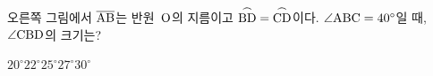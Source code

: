\noindent\begin{minipage}[t]{0.58\linewidth}\vspace{0pt}\raggedright 오른쪽 그림에서 $\overline{\mathrm{AB}}$는 반원~$\mathrm{O}$의 지름이고 $\overset{\frown}{\mathrm{BD}}=\overset{\frown}{\mathrm{CD}}$이다. $\angle\mathrm{ABC}=40^\circ$일 때, $\angle\mathrm{CBD}$의 크기는?\end{minipage}\hfill\begin{minipage}[t]{0.4\linewidth}\vspace{0pt}\centering \resizebox{\ifdim\width>\linewidth\linewidth\else\width\fi}{!}{}\end{minipage}\par
\begin{choices32}{$20^\circ$}{$22^\circ$}{$25^\circ$}{$27^\circ$}{$30^\circ$}\end{choices32}

